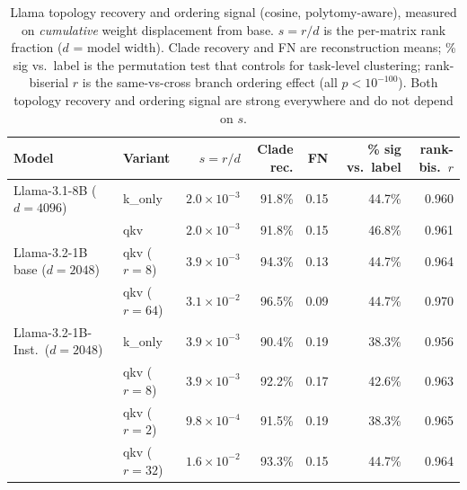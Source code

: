 \documentclass{article}
\begin{document}
\begin{table}[h]
\caption{Llama topology recovery and ordering signal (cosine, polytomy-aware), measured on
  \emph{cumulative} weight displacement from base. $s=r/d$ is the per-matrix rank fraction ($d$ =
  model width). Clade recovery and FN are reconstruction means; \% sig vs.\ label is the permutation
  test that controls for task-level clustering; rank-biserial $r$ is the same-vs-cross branch
  ordering effect (all $p<10^{-100}$). Both topology recovery and ordering signal are strong
  everywhere and do not depend on $s$.}
\label{tab:llama_recovery}
\begin{center}
\begin{tabular}{llrrrrr}
\toprule
Model & Variant & $s=r/d$ & Clade rec. & FN & \% sig vs.\ label & rank-bis.\ $r$ \\
\midrule
Llama-3.1-8B ($d{=}4096$)        & k\_only          & $2.0\!\times\!10^{-3}$ & 91.8\% & 0.15 & 44.7\% & 0.960 \\
                                 & qkv              & $2.0\!\times\!10^{-3}$ & 91.8\% & 0.15 & 46.8\% & 0.961 \\
\midrule
Llama-3.2-1B base ($d{=}2048$)   & qkv ($r{=}8$)    & $3.9\!\times\!10^{-3}$ & 94.3\% & 0.13 & 44.7\% & 0.964 \\
                                 & qkv ($r{=}64$)   & $3.1\!\times\!10^{-2}$ & 96.5\% & 0.09 & 44.7\% & 0.970 \\
\midrule
Llama-3.2-1B-Inst.\ ($d{=}2048$) & k\_only          & $3.9\!\times\!10^{-3}$ & 90.4\% & 0.19 & 38.3\% & 0.956 \\
                                 & qkv ($r{=}8$)    & $3.9\!\times\!10^{-3}$ & 92.2\% & 0.17 & 42.6\% & 0.963 \\
                                 & qkv ($r{=}2$)    & $9.8\!\times\!10^{-4}$ & 91.5\% & 0.19 & 38.3\% & 0.965 \\
                                 & qkv ($r{=}32$)   & $1.6\!\times\!10^{-2}$ & 93.3\% & 0.15 & 44.7\% & 0.964 \\
\bottomrule
\end{tabular}
\end{center}
\end{table}
\end{document}
